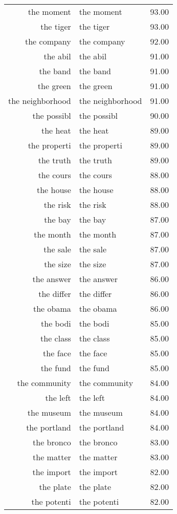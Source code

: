 \begin{table}[ht]
\begin{tabular}{rlr}
  the moment & the moment & 93.00 \\ 
  the tiger & the tiger & 93.00 \\ 
  the company & the company & 92.00 \\ 
  the abil & the abil & 91.00 \\ 
  the band & the band & 91.00 \\ 
  the green & the green & 91.00 \\ 
  the neighborhood & the neighborhood & 91.00 \\ 
  the possibl & the possibl & 90.00 \\ 
  the heat & the heat & 89.00 \\ 
  the properti & the properti & 89.00 \\ 
  the truth & the truth & 89.00 \\ 
  the cours & the cours & 88.00 \\ 
  the house & the house & 88.00 \\ 
  the risk & the risk & 88.00 \\ 
  the bay & the bay & 87.00 \\ 
  the month & the month & 87.00 \\ 
  the sale & the sale & 87.00 \\ 
  the size & the size & 87.00 \\ 
  the answer & the answer & 86.00 \\ 
  the differ & the differ & 86.00 \\ 
  the obama & the obama & 86.00 \\ 
  the bodi & the bodi & 85.00 \\ 
  the class & the class & 85.00 \\ 
  the face & the face & 85.00 \\ 
  the fund & the fund & 85.00 \\ 
  the community & the community & 84.00 \\ 
  the left & the left & 84.00 \\ 
  the museum & the museum & 84.00 \\ 
  the portland & the portland & 84.00 \\ 
  the bronco & the bronco & 83.00 \\ 
  the matter & the matter & 83.00 \\ 
  the import & the import & 82.00 \\ 
  the plate & the plate & 82.00 \\ 
  the potenti & the potenti & 82.00 \\ 

\end{tabular}
\end{table}

